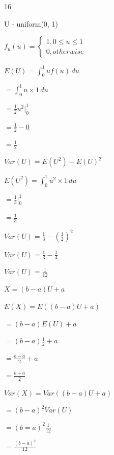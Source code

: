 \documentclass[12 pt]{article}
\begin{document}
    \begin{exercise}{16}
    \hfill

    U - uniform(0, 1)

    $f_u(u) = \begin{cases}
        1, 0 \leq u \leq 1 \\
        0, otherwise
    \end{cases}$

    $E(U) = \int_{0}^{1} u f(u) \, du$

    $= \int_{0}^{1} u \times 1 \, du$

    $= \frac{1}{2} u^2 |_{0}^{1}$

    $= \frac{1}{2} - 0$

    $= \frac{1}{2}$

    \hfill

    $Var(U) = E(U^2) - E(U)^2$

    \hfill

    $E(U^2) = \int_{0}^{1} u^2 \times 1 \, du$

    $= \frac{1}{3} |_{0}^{1}$

    $=\frac{1}{3}$

    \hfill

    $Var(U) = \frac{1}{3} - (\frac{1}{2})^2$

    $Var(U) = \frac{1}{3} - \frac{1}{4}$

    $Var(U) = \frac{1}{12}$

    \hfill

    $X= (b-a)U + a$

    \hfill

    $E(X) = E((b-a)U + a)$

    $= (b-a)E(U) + a$

    $= (b-a)\frac{1}{2} + a$

    $= \frac{b-a}{2} + a$

    $= \frac{b+a}{2}$

    \hfill

    $Var(X) = Var((b-a)U + a)$
    
    $= (b-a)^2 Var(U)$

    $= (b=a)^2 \frac{1}{12}$

    $= \frac{(b-a)^2}{12}$

    \hfill
    \end{exercise}
\end{document}
